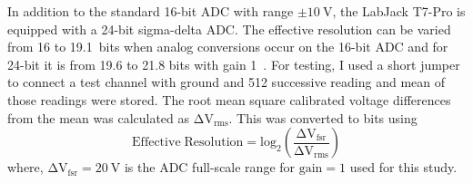 In addition to the standard 16-bit ADC with range $\pm10~\mathrm{V}$, the LabJack T7-Pro is equipped with a 24-bit sigma-delta ADC. The effective resolution can be varied from 16 to 19.1~bits when analog conversions occur on the 16-bit ADC and for 24-bit it is from 19.6 to 21.8 bits with gain 1~\cite{T7}. For testing, I used a short jumper to connect a test channel with ground and 512 successive reading and mean of those readings were stored. The root mean square calibrated voltage differences from the mean was calculated as $\mathrm{\Delta V_{rms}}$. This was converted to bits using
\begin{equation}
    \mathrm{Effective\;Resolution=log_2\left(\frac{\Delta V_{fsr}}{\Delta V_{rms}}\right)}
\end{equation}
where, $\mathrm{\Delta V_{fsr}=20~V}$ is the ADC full-scale range for $\mathrm{gain=1}$ used for this study.







